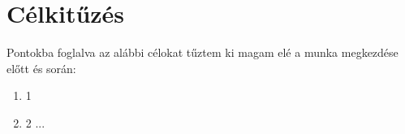 \chapter{Célkitűzés} \label{celkituzes}
\pagestyle{headings}

Pontokba foglalva az alábbi célokat tűztem ki magam elé a munka megkezdése előtt és során:

\begin{enumerate}
\item 1
\item 2 ...

\end{enumerate}


